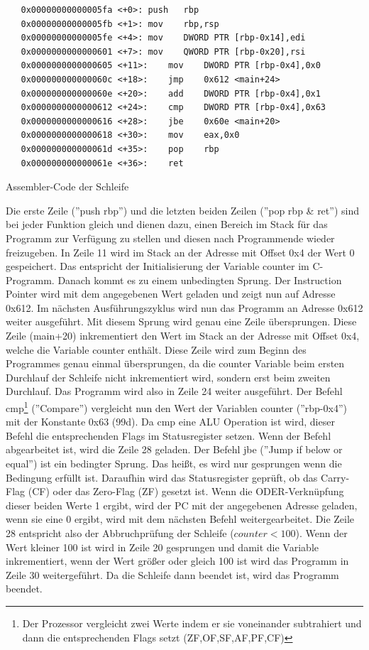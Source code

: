 \documentclass[a4paper,12pt]{article}
\begin{document}
\begin{code}[!htb]
\begin{lstlisting}
   0x00000000000005fa <+0>:	push   rbp
   0x00000000000005fb <+1>:	mov    rbp,rsp
   0x00000000000005fe <+4>:	mov    DWORD PTR [rbp-0x14],edi
   0x0000000000000601 <+7>:	mov    QWORD PTR [rbp-0x20],rsi
   0x0000000000000605 <+11>:	mov    DWORD PTR [rbp-0x4],0x0
   0x000000000000060c <+18>:	jmp    0x612 <main+24>
   0x000000000000060e <+20>:	add    DWORD PTR [rbp-0x4],0x1
   0x0000000000000612 <+24>:	cmp    DWORD PTR [rbp-0x4],0x63
   0x0000000000000616 <+28>:	jbe    0x60e <main+20>
   0x0000000000000618 <+30>:	mov    eax,0x0
   0x000000000000061d <+35>:	pop    rbp
   0x000000000000061e <+36>:	ret    
\end{lstlisting}
\caption[Assembler Code einfache Schleife]{Assembler-Code der Schleife}
\label{code:scheifeasm}
\end{code}

\noindent Die erste Zeile (''push rbp'') und die letzten beiden Zeilen (''pop rbp \& ret'') sind bei jeder Funktion gleich und dienen dazu, einen Bereich im Stack für das Programm zur Verfügung zu stellen und diesen nach Programmende wieder freizugeben. In Zeile 11 wird im Stack an der Adresse mit Offset 0x4 der Wert 0 gespeichert. Das entspricht der Initialisierung der Variable counter im C-Programm. Danach kommt es zu einem unbedingten Sprung. Der Instruction Pointer wird mit dem angegebenen Wert geladen und zeigt nun auf Adresse 0x612. Im nächsten Ausführungszyklus wird nun das Programm an Adresse 0x612 weiter ausgeführt. Mit diesem Sprung wird genau eine Zeile übersprungen. Diese Zeile (main+20) inkrementiert den Wert im Stack an der Adresse mit Offset 0x4, welche die Variable counter enthält. Diese Zeile wird zum Beginn des Programmes genau einmal übersprungen, da die counter Variable beim ersten Durchlauf der Schleife nicht inkrementiert wird, sondern erst beim zweiten Durchlauf. Das Programm wird also in Zeile 24 weiter ausgeführt. Der Befehl cmp\footnote{Der Prozessor vergleicht zwei Werte indem er sie voneinander subtrahiert und dann die entsprechenden Flags setzt (ZF,OF,SF,AF,PF,CF)\cite[S.176]{intel4000}} (''Compare'') vergleicht nun den Wert der Variablen counter (''rbp-0x4'') mit der Konstante 0x63 (99d). Da cmp eine ALU Operation ist wird, dieser Befehl die entsprechenden Flags im Statusregister setzen. Wenn der Befehl abgearbeitet ist, wird die Zeile 28 geladen. Der Befehl jbe (''Jump if below or equal'') ist ein bedingter Sprung. Das heißt, es wird nur gesprungen wenn die Bedingung erfüllt ist. Daraufhin wird das Statusregister geprüft, ob das Carry-Flag (CF) oder das Zero-Flag (ZF) gesetzt ist. Wenn die ODER-Verknüpfung dieser beiden Werte 1 ergibt, wird der PC mit der angegebenen Adresse geladen, wenn sie eine 0 ergibt, wird mit dem nächsten Befehl weitergearbeitet\cite[S.1060]{intel4000}. Die Zeile 28 entspricht also der Abbruchprüfung der Schleife  ($counter < 100$). Wenn der Wert kleiner 100 ist wird in Zeile 20 gesprungen und damit die Variable inkrementiert, wenn der Wert größer oder gleich 100 ist wird das Programm in Zeile 30 weitergeführt. Da die Schleife dann beendet ist, wird das Programm beendet.
\end{document}
